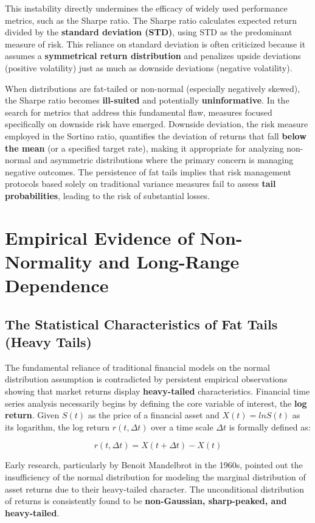 \documentclass{ieeetj}
\begin{document}
This instability directly undermines the efficacy of widely used performance metrics, such as the Sharpe ratio. The Sharpe ratio calculates expected return divided by the \textbf{standard deviation (STD)}, using STD as the predominant measure of risk. This reliance on standard deviation is often criticized because it assumes a \textbf{symmetrical return distribution} and penalizes upside deviations (positive volatility) just as much as downside deviations (negative volatility).

When distributions are fat-tailed or non-normal (especially negatively skewed), the Sharpe ratio becomes \textbf{ill-suited} and potentially \textbf{uninformative}. In the search for metrics that address this fundamental flaw, measures focused specifically on downside risk have emerged. Downside deviation, the risk measure employed in the Sortino ratio, quantifies the deviation of returns that fall \textbf{below the mean} (or a specified target rate), making it appropriate for analyzing non-normal and asymmetric distributions where the primary concern is managing negative outcomes. The persistence of fat tails implies that risk management protocols based solely on traditional variance measures fail to assess \textbf{tail probabilities}, leading to the risk of substantial losses.


\section{Empirical Evidence of Non-Normality and Long-Range Dependence }
\subsection{The Statistical Characteristics of Fat Tails (Heavy Tails)}

The fundamental reliance of traditional financial models on the normal distribution assumption is contradicted by persistent empirical observations showing that market returns display \textbf{heavy-tailed} characteristics. Financial time series analysis necessarily begins by defining the core variable of interest, the \textbf{log return}. Given $S(t)$ as the price of a financial asset and $X(t)=lnS(t)$ as its logarithm, the log return $r(t,\Delta{t})$ over a time scale $\Delta{t}$ is formally defined as:

$$r(t,\Delta{t})=X(t+\Delta{t})-X(t)$$

Early research, particularly by Benoit Mandelbrot in the 1960s, pointed out the insufficiency of the normal distribution for modeling the marginal distribution of asset returns due to their heavy-tailed character. The unconditional distribution of returns is consistently found to be \textbf{non-Gaussian, sharp-peaked, and heavy-tailed}.
\end{document}
